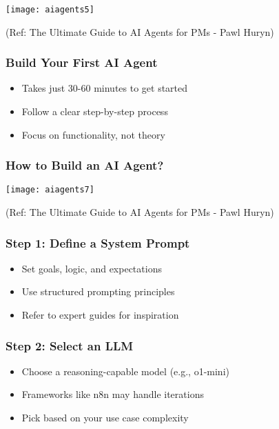 \begin{frame}[fragile]\frametitle{}

\begin{center}
\texttt{[image: aiagents5]}

{\tiny (Ref: The Ultimate Guide to AI Agents for PMs - Pawl Huryn)}
\end{center}	
  
\end{frame}

\begin{frame}[fragile]\frametitle{Build Your First AI Agent}
      \begin{itemize}
        \item Takes just 30-60 minutes to get started
        \item Follow a clear step-by-step process
        \item Focus on functionality, not theory
      \end{itemize}
\end{frame}

\begin{frame}[fragile]\frametitle{How to Build an AI Agent?}

	\begin{center}
	\texttt{[image: aiagents7]}
	\end{center}
	
	{\tiny (Ref: The Ultimate Guide to AI Agents for PMs - Pawl Huryn)}
\end{frame}


\begin{frame}[fragile]\frametitle{Step 1: Define a System Prompt}
      \begin{itemize}
        \item Set goals, logic, and expectations
        \item Use structured prompting principles
        \item Refer to expert guides for inspiration
      \end{itemize}
\end{frame}

\begin{frame}[fragile]\frametitle{Step 2: Select an LLM}
      \begin{itemize}
        \item Choose a reasoning-capable model (e.g., o1-mini)
        \item Frameworks like n8n may handle iterations
        \item Pick based on your use case complexity
      \end{itemize}
\end{frame}

